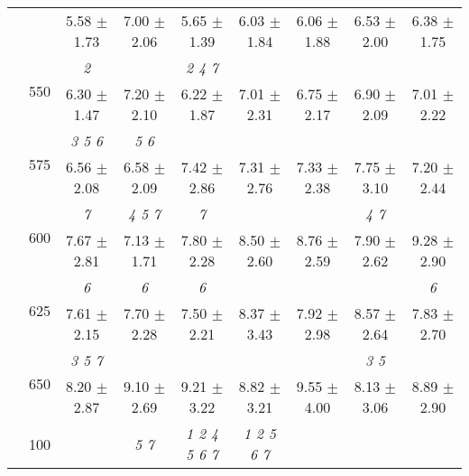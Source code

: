 \begin{table}[h]
{\begin{tabular}{
        ccccccccc}
 & & \cellcolor[HTML]{EFEFEF} 5.58 $\pm$ 1.73& \cellcolor[HTML]{EFEFEF} 7.00 $\pm$ 2.06& \cellcolor[HTML]{EFEFEF} 5.65 $\pm$ 1.39& \cellcolor[HTML]{EFEFEF} 6.03 $\pm$ 1.84& \cellcolor[HTML]{EFEFEF} 6.06 $\pm$ 1.88& \cellcolor[HTML]{EFEFEF} 6.53 $\pm$ 2.00& \cellcolor[HTML]{EFEFEF} 6.38 $\pm$ 1.75 \\ 
 & \multirow{2}{*}{550}& \textit{ 2 }& & \textit{ 2 4 7 }& & & &  \\ 
 & & 6.30 $\pm$ 1.47& 7.20 $\pm$ 2.10& 6.22 $\pm$ 1.87& 7.01 $\pm$ 2.31& 6.75 $\pm$ 2.17& 6.90 $\pm$ 2.09& 7.01 $\pm$ 2.22 \\ 
 & \multirow{2}{*}{575}& \cellcolor[HTML]{EFEFEF} \textit{ 3 5 6 }& \cellcolor[HTML]{EFEFEF} \textit{ 5 6 }& \cellcolor[HTML]{EFEFEF} & \cellcolor[HTML]{EFEFEF} & \cellcolor[HTML]{EFEFEF} & \cellcolor[HTML]{EFEFEF} & \cellcolor[HTML]{EFEFEF}  \\ 
 & & \cellcolor[HTML]{EFEFEF} 6.56 $\pm$ 2.08& \cellcolor[HTML]{EFEFEF} 6.58 $\pm$ 2.09& \cellcolor[HTML]{EFEFEF} 7.42 $\pm$ 2.86& \cellcolor[HTML]{EFEFEF} 7.31 $\pm$ 2.76& \cellcolor[HTML]{EFEFEF} 7.33 $\pm$ 2.38& \cellcolor[HTML]{EFEFEF} 7.75 $\pm$ 3.10& \cellcolor[HTML]{EFEFEF} 7.20 $\pm$ 2.44 \\ 
 & \multirow{2}{*}{600}& \textit{ 7 }& \textit{ 4 5 7 }& \textit{ 7 }& & & \textit{ 4 7 }&  \\ 
 & & 7.67 $\pm$ 2.81& 7.13 $\pm$ 1.71& 7.80 $\pm$ 2.28& 8.50 $\pm$ 2.60& 8.76 $\pm$ 2.59& 7.90 $\pm$ 2.62& 9.28 $\pm$ 2.90 \\ 
 & \multirow{2}{*}{625}& \cellcolor[HTML]{EFEFEF} \textit{ 6 }& \cellcolor[HTML]{EFEFEF} \textit{ 6 }& \cellcolor[HTML]{EFEFEF} \textit{ 6 }& \cellcolor[HTML]{EFEFEF} & \cellcolor[HTML]{EFEFEF} & \cellcolor[HTML]{EFEFEF} & \cellcolor[HTML]{EFEFEF} \textit{ 6 } \\ 
 & & \cellcolor[HTML]{EFEFEF} 7.61 $\pm$ 2.15& \cellcolor[HTML]{EFEFEF} 7.70 $\pm$ 2.28& \cellcolor[HTML]{EFEFEF} 7.50 $\pm$ 2.21& \cellcolor[HTML]{EFEFEF} 8.37 $\pm$ 3.43& \cellcolor[HTML]{EFEFEF} 7.92 $\pm$ 2.98& \cellcolor[HTML]{EFEFEF} 8.57 $\pm$ 2.64& \cellcolor[HTML]{EFEFEF} 7.83 $\pm$ 2.70 \\ 
 & \multirow{2}{*}{650}& \textit{ 3 5 7 }& & & & & \textit{ 3 5 }&  \\ 
 & & 8.20 $\pm$ 2.87& 9.10 $\pm$ 2.69& 9.21 $\pm$ 3.22& 8.82 $\pm$ 3.21& 9.55 $\pm$ 4.00& 8.13 $\pm$ 3.06& 8.89 $\pm$ 2.90 \\ \midrule 
 & \multirow{2}{*}{100}& & \textit{ 5 7 }& \textit{ 1 2 4 5 6 7 }& \textit{ 1 2 5 6 7 }& & &  \\ 

\end{tabular}}
\end{table}
